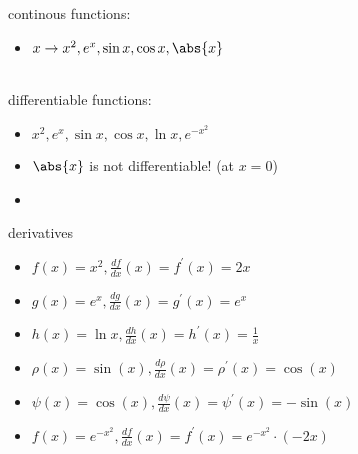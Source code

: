 \newpage
\begin{bsp} 
	\blank
	continous functions:
	\begin{itemize}
		\item $x \rightarrow x^2, e^x, \sin{x}, \cos{x}, \abs{x} $\\
	\end{itemize}
 ~\\
  differentiable functions:
	\begin{itemize}
		\item $x^2, e^x, \sin{x}, \cos{x}, \ln{x}, e^{-x^2}$\\
		\item $\abs{x}$ is not differentiable! (at $x = 0$)\\
		\item[]
	\end{itemize}
\end{bsp}

\newpage
\begin{bsp}
	\blank
	 derivatives
	\begin{itemize}
		\item $f(x) = x^2, \frac{df}{dx}(x) = f^\prime (x) = 2x$\\
		\item $g(x) = e^x, \frac{dg}{dx}(x) = g^\prime (x) = e^x$\\
		\item $h(x) = \ln{x}, \frac{dh}{dx}(x) = h^\prime (x) = \frac{1}{x}$\\
		\item $\rho (x) = \sin{(x)}, \frac{d\rho}{dx}(x) = \rho^\prime (x) = \cos{(x)}$\\
		\item $\psi (x) = \cos{(x)}, \frac{d\psi}{dx}(x) = \psi^\prime (x) = -\sin{(x)}$\\
		\item $f(x) = e^{-x^2}, \frac{df}{dx}(x) = f^\prime (x) = e^{-x^2}\cdot(-2x)$
	\end{itemize}
\end{bsp}
\newpage

